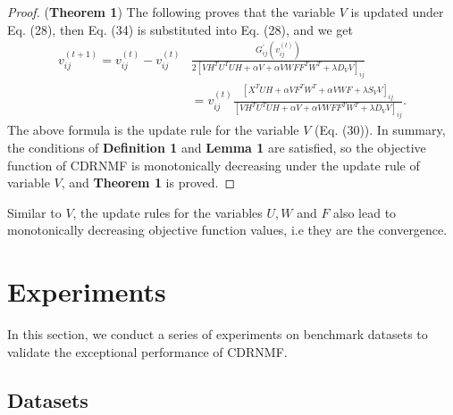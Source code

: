 \documentclass[a4paper,fleqn]{cas-sc}
\begin{document}
\begin{proof}
	(\textbf{Theorem 1}) The following proves that the variable $V$ is updated under Eq. (28), then Eq. (34) is substituted into Eq. (28), and we get
	\begin{equation}
		\begin{aligned}
			v_{i j}^{(t+1)}=v_{i j}^{(t)}-v_{i j}^{(t)} & \frac{G_{i j}^{\prime}\left(v_{i j}^{(t)}\right)}{2\left[V H^T U^T U H+\alpha V+\alpha V W F F^T W^T+\lambda D_V V\right]_{i j}} \\
			& =v_{i j}^{(t)} \frac{\left[X^T U H+\alpha V F^T W^T+\alpha V W F+\lambda S_V V\right]_{i j}}{\left[V H^T U^T U H+\alpha V+\alpha V W F F^T W^T+\lambda D_V V\right]_{i j}} .
		\end{aligned}
	\end{equation}
	The above formula is the update rule for the variable $V$ (Eq. (30)). In summary, the conditions of \textbf{Definition 1} and \textbf{Lemma 1} are satisfied, so the objective function of CDRNMF is monotonically decreasing under the update rule of variable $V$, and \textbf{Theorem 1} is proved.
\end{proof}

Similar to $V$, the update rules for the variables $U, W$ and $F$ also lead to monotonically decreasing objective function values, i.e they are the convergence.

\section{Experiments}

In this section, we conduct a series of experiments on benchmark datasets to validate the exceptional performance of CDRNMF. 

\subsection{Datasets}
\end{document}
